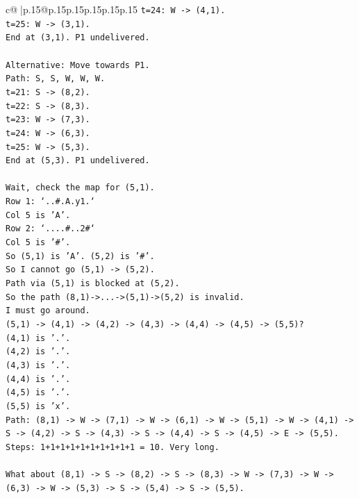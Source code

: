 \documentclass{article}
\begin{document}
{\begin{supertabular}{c@{$\;$}|p{.15\linewidth}@{}p{.15\linewidth}p{.15\linewidth}p{.15\linewidth}p{.15\linewidth}p{.15\linewidth}}
{{{\texttt{t=24: W {-}> (4,1).} \\
\texttt{t=25: W {-}> (3,1).} \\
\texttt{End at (3,1). P1 undelivered.} \\
\\ 
\texttt{Alternative: Move towards P1.} \\
\texttt{Path: S, S, W, W, W.} \\
\texttt{t=21: S {-}> (8,2).} \\
\texttt{t=22: S {-}> (8,3).} \\
\texttt{t=23: W {-}> (7,3).} \\
\texttt{t=24: W {-}> (6,3).} \\
\texttt{t=25: W {-}> (5,3).} \\
\texttt{End at (5,3). P1 undelivered.} \\
\\ 
\texttt{Wait, check the map for (5,1).} \\
\texttt{Row 1: `..\#.A.y1.`} \\
\texttt{Col 5 is 'A'.} \\
\texttt{Row 2: `....\#..2\#`} \\
\texttt{Col 5 is '\#'.} \\
\texttt{So (5,1) is 'A'. (5,2) is '\#'.} \\
\texttt{So I cannot go (5,1) {-}> (5,2).} \\
\texttt{Path via (5,1) is blocked at (5,2).} \\
\texttt{So the path (8,1){-}>...{-}>(5,1){-}>(5,2) is invalid.} \\
\texttt{I must go around.} \\
\texttt{(5,1) {-}> (4,1) {-}> (4,2) {-}> (4,3) {-}> (4,4) {-}> (4,5) {-}> (5,5)?} \\
\texttt{(4,1) is '.'.} \\
\texttt{(4,2) is '.'.} \\
\texttt{(4,3) is '.'.} \\
\texttt{(4,4) is '.'.} \\
\texttt{(4,5) is '.'.} \\
\texttt{(5,5) is 'x'.} \\
\texttt{Path: (8,1) {-}> W {-}> (7,1) {-}> W {-}> (6,1) {-}> W {-}> (5,1) {-}> W {-}> (4,1) {-}> S {-}> (4,2) {-}> S {-}> (4,3) {-}> S {-}> (4,4) {-}> S {-}> (4,5) {-}> E {-}> (5,5).} \\
\texttt{Steps: 1+1+1+1+1+1+1+1+1+1 = 10. Very long.} \\
\\ 
\texttt{What about (8,1) {-}> S {-}> (8,2) {-}> S {-}> (8,3) {-}> W {-}> (7,3) {-}> W {-}> (6,3) {-}> W {-}> (5,3) {-}> S {-}> (5,4) {-}> S {-}> (5,5).} \\
}}}
\end{supertabular}}
\end{document}
